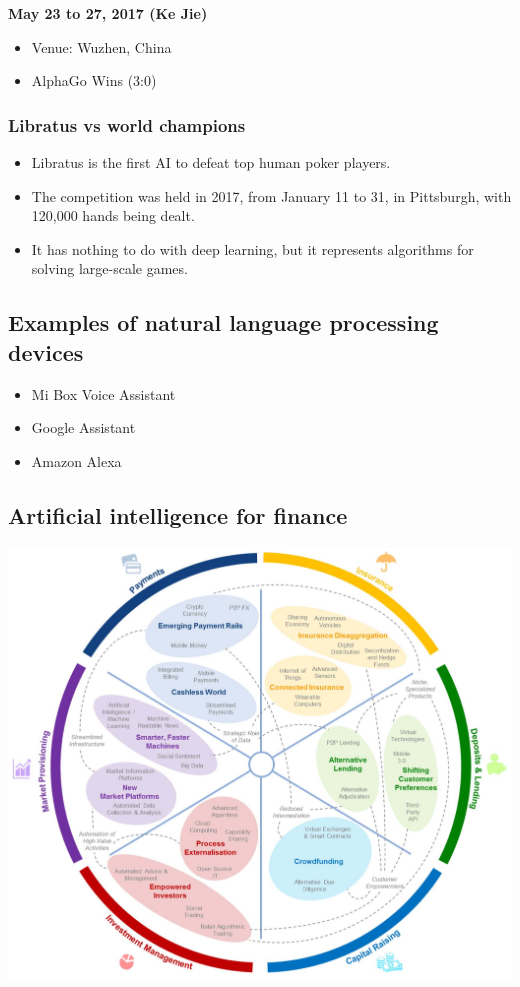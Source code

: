 \documentclass[11pt]{article}
\begin{document}
\textbf{May 23 to 27, 2017 (Ke Jie)}
\begin{itemize}
\item Venue: Wuzhen, China
\item AlphaGo Wins (3:0)
\end{itemize}
\subsubsection{Libratus vs world champions}
\label{sec:org345abfb}
\begin{itemize}
\item Libratus is the first AI to defeat top human poker players.
\item The competition was held in 2017, from January 11 to 31, in Pittsburgh, with 120,000 hands being dealt.
\item It has nothing to do with deep learning, but it represents algorithms for solving large-scale games.
\end{itemize}
\subsection{Examples of natural language processing devices}
\label{sec:org6ee1ad5}
\begin{itemize}
\item Mi Box Voice Assistant
\item Google Assistant
\item Amazon Alexa
\end{itemize}
\subsection{Artificial intelligence for finance}
\label{sec:org570466a}
\begin{center}
\includegraphics[width=.9\linewidth]{./images/artificial-intelligence-for-finance.png}
\end{center}
\end{document}
